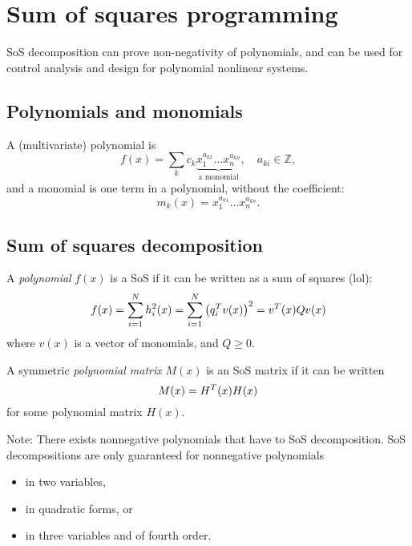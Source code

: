 \section{Sum of squares programming}
SoS decomposition can prove non-negativity of polynomials, and can be used for control analysis and design for polynomial nonlinear systems.

\subsection{Polynomials and monomials}
A (multivariate) polynomial is
%
\begin{equation}
  f(x) = \sum_k c_k
  \underbrace{x_1^{a_{k1}} \dots x_n^{a_{kn}}}_{\text{a monomial}},\quad a_{ki} \in \mathbb{Z},
\end{equation}
%
and a monomial is one term in a polynomial, without the coefficient:
%
\begin{equation}
  m_k(x) = x_1^{a_{k1}} \dots x_n^{a_{kn}}.
\end{equation}

\subsection{Sum of squares decomposition}
A \emph{polynomial} $f(x)$ is a SoS if it can be written as a sum of squares (lol):
%
\begin{equation}
  f(x) =
  \sum_{i=1}^N h_i^2(x) =
  \sum_{i=1}^N \left(q_i^{T} v(x)\right)^2 =
  v^{T}(x) Q v(x)
\end{equation}
%
where $v(x)$ is a vector of monomials, and $Q \geq 0$.

A symmetric \emph{polynomial matrix} $M(x)$ is an SoS matrix if it can be written
%
\begin{equation}
  M(x) = H^{T}(x) H(x)
\end{equation}
%
for some polynomial matrix $H(x)$.

Note: There exists nonnegative polynomials that have to SoS decomposition. SoS decompositions are only guaranteed for nonnegative polynomials
\begin{itemize}
  \item in two variables,
  \item in quadratic forms, or
  \item in three variables and of fourth order.
\end{itemize}

